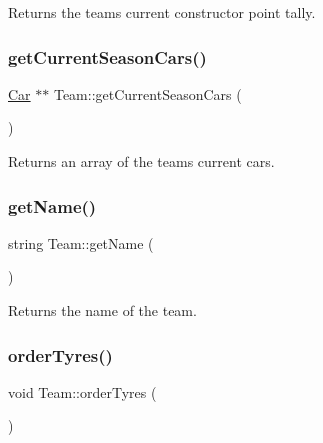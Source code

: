 \begin{DoxyReturn}{Returns}
the team\textquotesingle{}s current constructor point tally. 
\end{DoxyReturn}
\mbox{\label{classTeam_a8e71e64acc74a3346e373dde33f08233}} 
\subsubsection{\texorpdfstring{get\+Current\+Season\+Cars()}{getCurrentSeasonCars()}}
{\footnotesize\ttfamily \hyperlink{classCar}{Car} $\ast$$\ast$ Team\+::get\+Current\+Season\+Cars (\begin{DoxyParamCaption}{ }\end{DoxyParamCaption})}

\begin{DoxyReturn}{Returns}
an array of the team\textquotesingle{}s current cars. 
\end{DoxyReturn}
\mbox{\label{classTeam_ab21736a411213da36d08210e570ecbeb}} 
\subsubsection{\texorpdfstring{get\+Name()}{getName()}}
{\footnotesize\ttfamily string Team\+::get\+Name (\begin{DoxyParamCaption}{ }\end{DoxyParamCaption})}

\begin{DoxyReturn}{Returns}
the name of the team. 
\end{DoxyReturn}
\mbox{\label{classTeam_a6bf3c6839b7d2e4b38fbb160c41a40ab}} 
\subsubsection{\texorpdfstring{order\+Tyres()}{orderTyres()}}
{\footnotesize\ttfamily void Team\+::order\+Tyres (\begin{DoxyParamCaption}{ }\end{DoxyParamCaption})}

